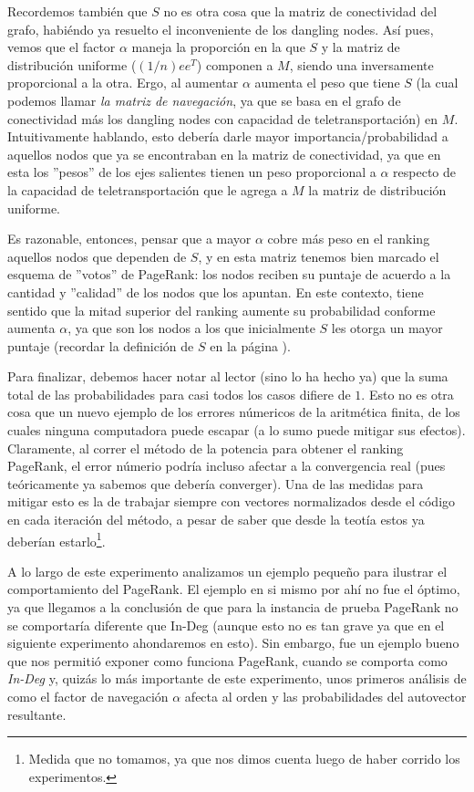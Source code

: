 \par Recordemos tambi\'en que $S$ no es otra cosa que la matriz de conectividad
del grafo, habi\'endo ya resuelto el inconveniente de los dangling nodes. As\'i
pues, vemos que el factor $\alpha$ maneja la proporci\'on en la que $S$ y la
matriz de distribuci\'on uniforme ($(1/n)ee^T$) componen a $M$, siendo una
inversamente proporcional a la otra. Ergo, al aumentar $\alpha$ aumenta el peso
que tiene $S$ (la cual podemos llamar \emph{la matriz de navegaci\'on}, ya que
se basa en el grafo de conectividad m\'as los dangling nodes con capacidad de
teletransportaci\'on) en $M$. Intuitivamente hablando, esto deber\'ia darle
mayor importancia/probabilidad a aquellos nodos que ya se encontraban en la
matriz de conectividad, ya que en esta los ''pesos'' de los ejes salientes
tienen un peso proporcional a $\alpha$ respecto de la capacidad de
teletransportaci\'on que le agrega a $M$ la matriz de distribuci\'on uniforme.

\par Es razonable, entonces, pensar que a mayor $\alpha$ cobre m\'as peso en el
ranking aquellos nodos que dependen de $S$, y en esta matriz tenemos bien
marcado el esquema de ''votos'' de PageRank: los nodos reciben su puntaje de
acuerdo a la cantidad y ''calidad'' de los nodos que los apuntan. En este
contexto, tiene sentido que la mitad superior del ranking aumente su
probabilidad conforme aumenta $\alpha$, ya que son los nodos a los que
inicialmente $S$ les otorga un mayor puntaje (recordar la definici\'on de $S$ en
la p\'agina \pageref{eq:S}).

\par Para finalizar, debemos hacer notar al lector (sino lo ha hecho ya) que la
suma total de las probabilidades para casi todos los casos difiere de $1$. Esto
no es otra cosa que un nuevo ejemplo de los errores n\'umericos de la
aritm\'etica finita, de los cuales ninguna computadora puede escapar (a lo sumo
puede mitigar sus efectos). Claramente, al correr el m\'etodo de la potencia
para obtener el ranking PageRank, el error n\'umerio podr\'ia incluso afectar a
la convergencia real (pues te\'oricamente ya sabemos que deber\'ia converger).
Una de las medidas para mitigar esto es la de trabajar siempre con vectores
normalizados desde el c\'odigo en cada iteraci\'on del m\'etodo, a pesar de
saber que desde la teot\'ia estos ya deber\'ian estarlo\footnote{Medida que no
tomamos, ya que nos dimos cuenta luego de haber corrido los experimentos.}.

\medskip
\par A lo largo de este experimento analizamos un ejemplo peque\~no para
ilustrar el comportamiento del PageRank. El ejemplo en si mismo por ah\'i no fue
el \'optimo, ya que llegamos a la conclusi\'on de que para la instancia de
prueba PageRank no se comportar\'ia diferente que In-Deg (aunque esto no es tan
grave ya que en el siguiente experimento ahondaremos en esto). Sin embargo, fue
un ejemplo bueno que nos permiti\'o exponer como funciona PageRank, cuando se
comporta como \emph{In-Deg} y, quiz\'as lo m\'as importante de este experimento,
unos primeros an\'alisis de como el factor de navegaci\'on $\alpha$ afecta al
orden y las probabilidades del autovector resultante.
